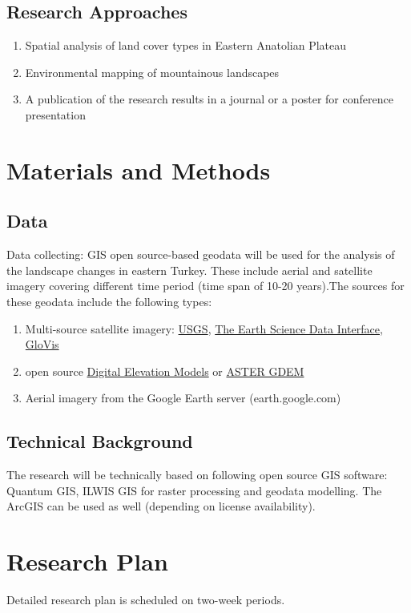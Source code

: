 \documentclass[10pt]{hitec}
\begin{document}
\subsection{Research Approaches}
\begin{enumerate}
	\item Spatial analysis of land cover types in Eastern Anatolian Plateau 
	\item Environmental mapping of mountainous landscapes
	\item A publication of the research results in a journal or a poster for conference presentation 
\end{enumerate}

\section{Materials and Methods}
\subsection{Data}
Data collecting: GIS open source-based geodata will be used for the analysis of the landscape changes in eastern Turkey. These include aerial and satellite imagery covering different time period (time span of 10-20 years).The sources for these geodata include the following types:
\begin{enumerate}
	\item Multi-source satellite imagery: \href{http://www.usgs.gov/pubprod/}{USGS}, \href{http://glcfapp.glcf.umd.edu/}{The Earth Science Data Interface}, \href{http://glovis.usgs.gov/}{GloVis}
	\item open source \href{http://geomorphometry.org/content/data-sets}{Digital Elevation Models} or \href{http://www.gdem.aster.ersdac.or.jp/search.jsp}{ASTER GDEM}
	\item Aerial imagery from the Google Earth server (earth.google.com)
\end{enumerate}

\subsection{Technical Background}
The research will be technically based on following open source GIS software: Quantum GIS, ILWIS GIS for raster processing and geodata modelling. The ArcGIS can be used as well (depending on license availability).

\section{Research Plan}
Detailed research plan is scheduled on two-week periods. 
\end{document}
